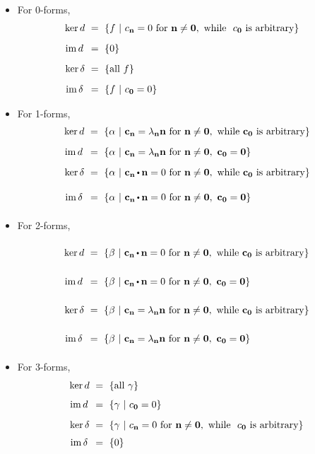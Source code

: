 \begin{itemize}
\item For 0-forms, 
$$
\begin{aligned}
\ker d &\ = \ \{f \ | \  c_{\textup{\bf n}}=0\ \mbox{\rm for}\ \textup{\bf n}\ne{\bf0},
\mbox{\rm\ while\ }
\ c_{\bf0}
\ \mbox{\rm is arbitrary}\} \ \ \ \\[0.2cm]
\mathrm{im\,} d\, &\ = \  \{0\} \\[0.2cm]
\ker \delta &\ = \  \{\mbox{\rm all}\ f\} \\[0.2cm]
\mathrm{im\,} \delta\, &\ = \  \{f \ | \  c_{\bf0}=0\}
\end{aligned}
$$
\item For 1-forms,
$$
\begin{aligned}
\ker d &\ = \  \{\alpha \st \c_\n=\lambda_\n\n\ \mbox{\rm for}\ \n\ne\zero,
\mbox{\rm\ while\ }\c_\zero
\ \mbox{\rm is arbitrary}\} \\[0.2cm] 
\im d\, &\ = \  \{\alpha \st \c_\n=\lambda_\n\n\ \mbox{\rm for}\ \n\ne\zero,\ \c_\zero=\zero\} \\[0.2cm]
\ker \delta &\ = \  \{\alpha \st \c_\n\dt\n =0\ \mbox{\rm for}\ \n\ne\zero,
\mbox{\rm\ while\ }\c_\zero \ \mbox{\rm is arbitrary}\} \\[0cm]
\im \delta\, &\ = \  \{\alpha \st \c_\n\dt\n=0\ \mbox{\rm for}
\ \n\ne\zero,\ \c_\zero=\zero\}
\end{aligned}
$$
\item For 2-forms,
$$
\begin{aligned}
\ker d &\ = \  \{\beta \st \c_\n\dt\n=0\ \mbox{\rm for}\ \n\ne\zero,
\mbox{\rm\ while\ }\c_\zero
\ \mbox{\rm is arbitrary}\} \\[0.01cm]
\im d\, &\ = \  \{\beta \st \c_\n\dt\n=0\ \mbox{\rm for}\ \n\ne\zero,\ \c_\zero=\zero\} \\[0cm]
\ker \delta &\ = \  \{\beta \st \c_\n=\lambda_\n\n\ \mbox{\rm for}\ \n\ne\zero,
\mbox{\rm\ while\ }\c_\zero \ \mbox{\rm is arbitrary}\} \\[0cm]
\im \delta\, &\ = \  \{\beta \st \c_\n=\lambda_\n\n\ \mbox{\rm for}
\ \n\ne\zero,\ \c_\zero=\zero\}
\end{aligned}
$$
\item For 3-forms,
$$
\begin{aligned}
\ker d&\ = \ \{\mbox{\rm all}\ \gamma\}\\[0.15cm]
\mathrm{im\,} d\, &\ = \  \{\gamma \ | \  c_{\bf0}=0\} \\[0.2cm]
\ker \delta &\ = \  \{\gamma \ | \  c_{\textup{\bf n}}=0\ \mbox{\rm for}\ \textup{\bf n}\ne{\bf0},
\mbox{\rm\ while\ }\ c_{\bf0}
\ \mbox{\rm is arbitrary}\} \\[0.1cm]
\mathrm{im\,} \delta\, &\ = \ \{0\}
\end{aligned}
$$
\end{itemize}

